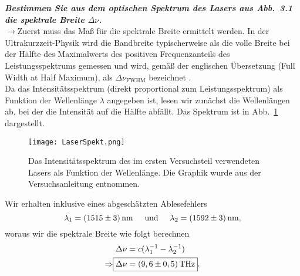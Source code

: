 \textbf{\textit{Bestimmen Sie aus dem optischen Spektrum des Lasers aus Abb.~3.1 die spektrale
Breite $\Delta \nu$.}}\\
$\rightarrow$Zuerst muss das Maß für die spektrale Breite ermittelt werden. 
In der Ultrakurzzeit-Physik wird die Bandbreite typischerweise als die volle Breite bei 
der Hälfte des Maximalwerts des positiven Frequenzanteils des Leistungsspektrums gemessen und wird, 
gemäß der englischen Übersetzung (Full Width at Half Maximum), 
als $\Delta \nu_{\text{FWHM}}$ bezeichnet \cite{UltraFast}. \\
Da das Intensitätsspektrum (direkt proportional zum Leistungsspektrum) als Funktion der 
Wellenlänge $\lambda$ angegeben ist, lesen wir zunächst die Wellenlängen ab, bei der die Intensität auf 
die Hälfte abfällt. Das Spektrum ist in Abb.~\ref{fig:spektrum} dargestellt.
\begin{figure}[h!]
    \centering
    \texttt{[image: LaserSpekt.png]}
    \caption{\label{fig:spektrum}Das Intensitätsspektrum des im ersten Versuchsteil verwendeten Lasers
    als Funktion der Wellenlänge. Die Graphik wurde aus der Versuchsanleitung \cite{Anleitung} entnommen.}
\end{figure}\FloatBarrier 
Wir erhalten inklusive eines abgeschätzten Ablesefehlers 
\begin{equation}
    \lambda_{1} = (1515\pm 3)\,\si{nm} \hspace{0.5cm} \text{und} \hspace{0.5cm} \lambda_{2} = (1592\pm3 )\,\si{nm},
\end{equation}
woraus wir die spektrale Breite wie folgt berechnen
\begin{align}
    \Delta \nu &= c (\lambda_{1}^{-1} - \lambda_{2}^{-1}) \\
    \Rightarrow \Aboxed{\Delta \nu &= (9,6 \pm 0,5)\,\si{THz}}. \label{eq:spektrale}
\end{align} \newpage

